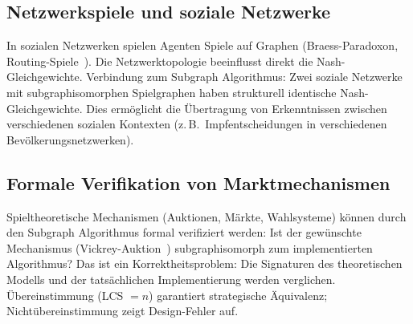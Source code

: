 ﻿\documentclass[a4paper,12pt]{article}
\theoremstyle{definition}
\begin{document}
\subsection{Netzwerkspiele und soziale Netzwerke}

In sozialen Netzwerken spielen Agenten Spiele auf Graphen (Braess-Paradoxon,
Routing-Spiele~\cite{roughgarden2005}). Die Netzwerktopologie beeinflusst
direkt die Nash-Gleichgewichte.
Verbindung zum Subgraph Algorithmus: Zwei soziale Netzwerke mit subgraphisomorphen
Spielgraphen haben strukturell identische Nash-Gleichgewichte.
Dies erm\"oglicht die \"Ubertragung von Erkenntnissen zwischen verschiedenen
sozialen Kontexten (z.\,B.\ Impfentscheidungen in verschiedenen
Bev\"olkerungsnetzwerken).

\subsection{Formale Verifikation von Marktmechanismen}

Spieltheoretische Mechanismen (Auktionen, M\"arkte, Wahlsysteme) k\"onnen
durch den Subgraph Algorithmus formal verifiziert werden:
Ist der gew\"unschte Mechanismus (Vickrey-Auktion~\cite{vickrey1961}) subgraphisomorph
zum implementierten Algorithmus?
Das ist ein Korrektheitsproblem: Die Signaturen des theoretischen Modells
und der tats\"achlichen Implementierung werden verglichen.
\"Ubereinstimmung (LCS $= n$) garantiert strategische \"Aquivalenz;
Nichtübereinstimmung zeigt Design-Fehler auf.
\end{document}
